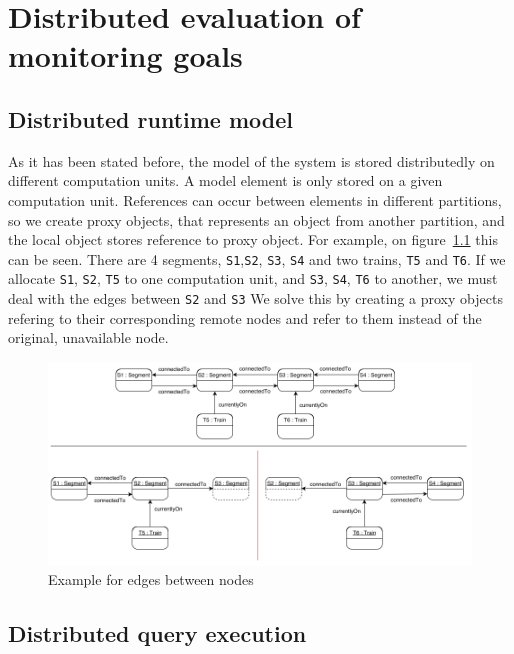 %
\chapter{Distributed evaluation of monitoring goals}
%


\section{Distributed runtime model}

As it has been stated before, the model of the system is stored distributedly on different computation units. A model element is only stored on a given computation unit. References can occur between elements in different partitions, so we create proxy objects, that represents an object from another partition, and the local object stores reference to proxy object. For example, on figure~\ref{fig:distrib-model-example} this can be seen. There are 4 segments, \texttt{S1},\texttt{S2}, \texttt{S3}, \texttt{S4} and two trains, \texttt{T5} and \texttt{T6}. If we allocate \texttt{S1}, \texttt{S2}, \texttt{T5} to one computation unit, and \texttt{S3}, \texttt{S4}, \texttt{T6} to another, we must deal with the edges between \texttt{S2} and \texttt{S3} We solve this by creating a proxy objects refering to their corresponding remote nodes and refer to them instead of the original, unavailable node.

\begin{figure}[h]
	\begin{center}
		\includegraphics[width=\textwidth]{figures/distributed-model.png}
		\caption{Example for edges between nodes}
		\label{fig:distrib-model-example}
	\end{center}
\end{figure}




\section{Distributed query execution}



